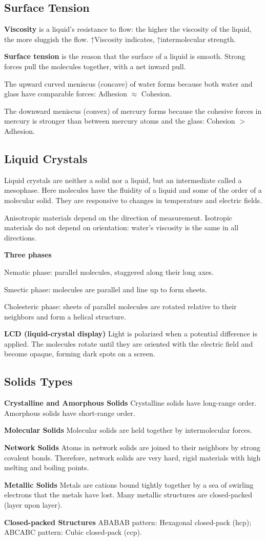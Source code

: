 \documentclass[a4paper,12pt]{article}
\begin{document}
\subsection{Surface Tension}
\textbf{Viscosity} is a liquid’s resistance to flow: the higher the viscosity of the liquid,
the more sluggish the flow. ↑Viscosity indicates, ↑intermolecular strength.\par
\textbf{Surface tension} is the reason that the surface of a liquid is smooth. Strong forces pull the molecules together, with a net inward pull.\par
The upward curved meniscus (concave) of water forms because both water and glass have comparable forces: Adhesion $\approx$ Cohesion.\par
The downward meniscus (convex) of mercury forms because the cohesive forces in mercury is stronger than between mercury atoms and the glass: Cohesion $>$ Adhesion.
\subsection{Liquid Crystals}
Liquid crystals are neither a solid nor a liquid, but an intermediate called a mesophase. Here molecules have the fluidity of a liquid and some of the order of a molecular solid. They are responsive to changes in temperature and electric fields.\par
Anisotropic materials depend on the direction of measurement. Isotropic materials do not depend on orientation: water’s viscosity is the same in all directions.\par
\textbf{Three phases}\par
Nematic phase: parallel molecules, staggered along their long axes.\par
Smectic phase: molecules are parallel and line up to form sheets.\par
Cholesteric phase: sheets of parallel molecules are rotated relative to their neighbors and form a helical structure.\par
\textbf{LCD (liquid-crystal display)} Light is polarized when a potential difference is applied. The molecules rotate until they are oriented with the electric field and become opaque, forming dark spots on a screen.
\subsection{Solids Types}
\textbf{Crystalline and Amorphous Solids} Crystalline solids have long-range order. Amorphous solids have short-range order.\par
\textbf{Molecular Solids} Molecular solids are held together by intermolecular forces.\par
\textbf{Network Solids} Atoms in network solids are joined to their neighbors by strong covalent bonds. Therefore, network solids are very hard, rigid materials with high melting and boiling points.\par
\textbf{Metallic Solids} Metals are cations bound tightly together by a sea of swirling electrons that the metals have lost. Many metallic structures are closed-packed (layer upon layer).\par
\textbf{Closed-packed Structures} ABABAB pattern: Hexagonal closed-pack (hcp); ABCABC pattern: Cubic closed-pack (ccp).
\end{document}
